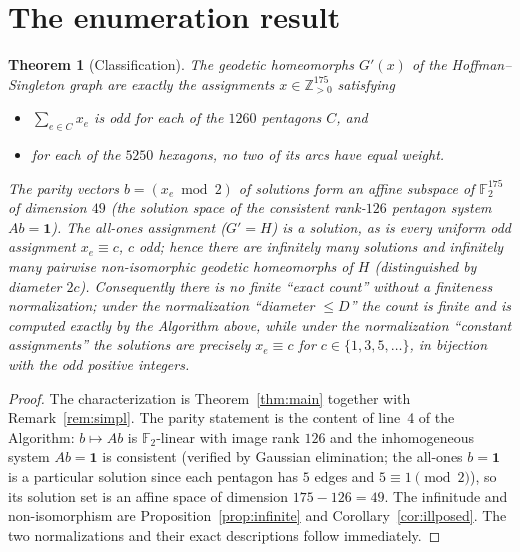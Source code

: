\documentclass{amsart}
\newtheorem{theorem}{Theorem}
\theoremstyle{definition}
\begin{document}
\section{The enumeration result}

\begin{theorem}[Classification]\label{thm:class}
The geodetic homeomorphs $G'(x)$ of the Hoffman--Singleton graph are exactly the
assignments $x\in\mathbb Z_{>0}^{175}$ satisfying
\begin{itemize}
\item[\textnormal{(P)}] $\sum_{e\in C}x_e$ is odd for each of the $1260$
pentagons $C$, and
\item[\textnormal{(H)}] for each of the $5250$ hexagons, no two of its arcs
have equal weight.
\end{itemize}
The parity vectors $b=(x_e\bmod 2)$ of solutions form an affine subspace of
$\mathbb F_2^{175}$ of dimension $49$ (the solution space of the consistent
rank-$126$ pentagon system $Ab=\mathbf 1$). The all-ones assignment ($G'=H$)
is a solution, as is every uniform odd assignment $x_e\equiv c$, $c$ odd; hence
there are infinitely many solutions and infinitely many pairwise non-isomorphic
geodetic homeomorphs of $H$ (distinguished by diameter $2c$). Consequently there
is no finite ``exact count'' without a finiteness normalization; under the
normalization ``diameter $\le D$'' the count is finite and is computed exactly by
the Algorithm above, while under the normalization ``constant assignments'' the
solutions are precisely $x_e\equiv c$ for $c\in\{1,3,5,\dots\}$, in bijection
with the odd positive integers.
\end{theorem}

\begin{proof}
The characterization is Theorem~\ref{thm:main} together with
Remark~\ref{rem:simpl}. The parity statement is the content of line~4 of the
Algorithm: $b\mapsto Ab$ is $\mathbb F_2$-linear with image rank $126$ and the
inhomogeneous system $Ab=\mathbf 1$ is consistent (verified by Gaussian
elimination; the all-ones $b=\mathbf 1$ is a particular solution since each
pentagon has $5$ edges and $5\equiv1\pmod2$), so its solution set is an affine
space of dimension $175-126=49$. The infinitude and non-isomorphism are
Proposition~\ref{prop:infinite} and Corollary~\ref{cor:illposed}. The two
normalizations and their exact descriptions follow immediately.
\end{proof}
\end{document}
